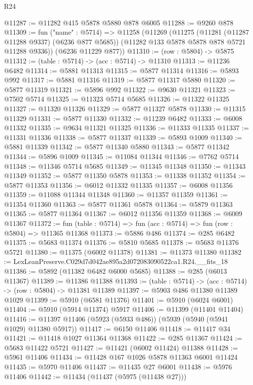 \begin{lexlean}{R24}
\begin{coremodule}
@11287 := @11282 @415 @5878 @5880 @878 @6005
@11288 := @9260 @878
@11309 := fun ("name" : @5714) =>
  @11258
    (@11269
      (@11275
        (@11281 (@11287 @11288 @9337) (@6236 @877 @5685))
        (@11282 @133 @5878 @5878 @878 @5721 @11288 @9336))
      (@6236 @11229 @877))
@11310 := (row : @5804) -> @5875
@11312 := (table : @5714) -> (acc : @5714) -> @11310
@11313 := @11236 @6482
@11314 := @5881 @11313
@11315 := @5877 @11314
@11316 := @5893 @992
@11317 := @5881 @11316
@11319 := @5877 @11317 @5880
@11320 := @5877 @11319
@11321 := @5896 @992
@11322 := @9630 @11321
@11323 := @7502 @5714
@11325 := @11323 @5714 @5685
@11326 := @11322 @11325
@11327 := @11320 @11326
@11329 := @5877 @11327 @5878
@11330 := @11315 @11329
@11331 := @5877 @11330
@11332 := @11239 @6482
@11333 := @6008 @11332
@11335 := @9634 @11321 @11325
@11336 := @11333 @11335
@11337 := @11331 @11336
@11338 := @5877 @11337
@11339 := @5893 @1009
@11340 := @5881 @11339
@11342 := @5877 @11340 @5880
@11343 := @5877 @11342
@11344 := @5896 @1009
@11345 := @11084 @11344
@11346 := @7762 @5714
@11348 := @11346 @5714 @5685
@11349 := @11345 @11348
@11350 := @11343 @11349
@11352 := @5877 @11350 @5878
@11353 := @11338 @11352
@11354 := @5877 @11353
@11356 := @6012 @11332 @11335
@11357 := @6008 @11356
@11359 := @11088 @11344 @11348
@11360 := @11357 @11359
@11361 := @11354 @11360
@11363 := @5877 @11361 @5878
@11364 := @5879 @11363
@11365 := @5877 @11364
@11367 := @6012 @11356 @11359
@11368 := @6009 @11367
@11372 := fun (table : @5714) => fun (acc : @5714) => fun (row : @5804) => @11365 @11368
@11373 := @5886 @486
@11374 := @285 @6482
@11375 := @5683 @11374
@11376 := @5810 @5685
@11378 := @5683 @11376 @5721
@11380 := @11375 (@6002 @11378)
@11381 := @11373 @11380
@11382 := LexLeanPreserve.C029d7d042ae895a2d072083090522ca1.R24.__fits_18
@11386 := @5892 (@11382 @6482 @6000 @5685)
@11388 := @285 (@6013 @11367)
@11389 := @11386 @11388
@11393 := (table : @5714) -> (acc : @5714) -> (row : @5804) -> @11381 @11389
@11397 := @5903 @486 @11380 @11389 @1029
@11399 := @5910 (@6581 @11376)
@11401 := @5910 (@6024 @6001)
@11404 := @5910 (@5914 @11374) @5917
@11406 := @11399 (@11401 @11404)
@11416 := @11397 @11406 (@5923 (@5933 @486)) (@5939 (@5940 (@5941 @1029) @11380 @5917))
@11417 := @6150 @11406
@11418 := @11417 @34
@11421 := @11418 @1027 @11364 @11368
@11422 := @285 @11367
@11424 := @5683 @11422 @5721
@11427 := @11421 (@6002 @11424) @11388
@11428 := @5961 @11406
@11434 := @11428 @167 @1026 @5878 @11363 @6001 @11424
@11435 := @5970 @11406
@11437 := @11435 @27 @6001
@11438 := @5976 @11406
@11442 := @11434 (@11437 (@5975 (@11438 @27)))

\end{coremodule}
\end{lexlean}
